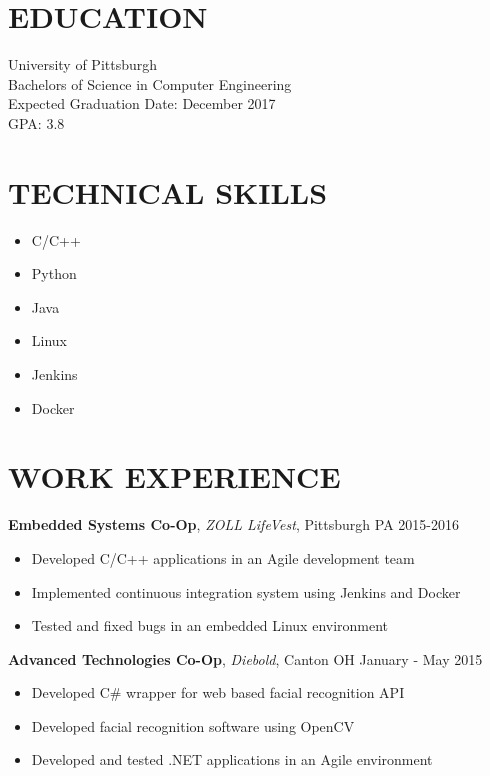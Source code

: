 \documentclass[line, margin]{res}
\begin{document}
\address{3136 Colony Lane \\ Plymouth Meeting, PA 19462 \\ (484) 866-6792}

\begin{resume}

\section{EDUCATION}
University of Pittsburgh \\
Bachelors of Science in Computer Engineering \\
Expected Graduation Date: December 2017 \\
GPA: 3.8

\section{TECHNICAL SKILLS}
\begin{itemize}
	\item C/C++
	\item Python
	\item Java
	\item Linux
	\item Jenkins
	\item Docker
\end{itemize}

\section{WORK EXPERIENCE}
\textbf{Embedded Systems Co-Op}, \textit{ZOLL LifeVest}, Pittsburgh PA 	\hfill 2015-2016 \\
\begin{itemize}
\item Developed C/C++ applications in an Agile development team
\item Implemented continuous integration system using Jenkins and Docker
\item Tested and fixed bugs in an embedded Linux environment
\end{itemize}

\textbf{Advanced Technologies Co-Op}, \textit{Diebold}, Canton OH \hfill January - May 2015 \\
\begin{itemize}
	\item Developed C\# wrapper for web based facial recognition API
	\item Developed facial recognition software using OpenCV
	\item Developed and tested .NET applications in an Agile environment
\end{itemize}


\end{resume}
\end{document}
